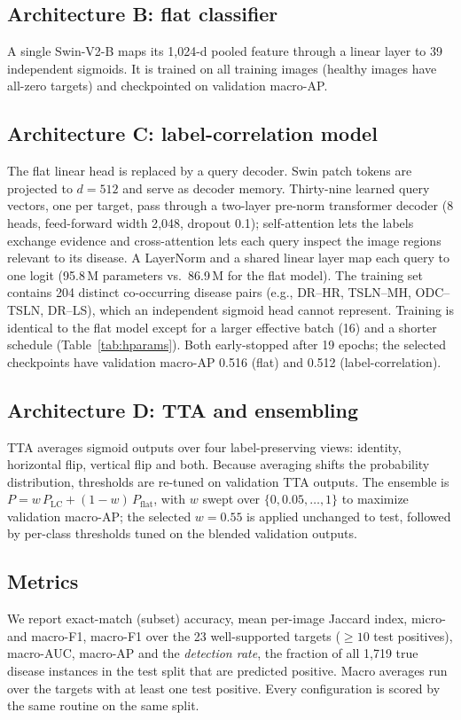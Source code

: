 \documentclass[conference]{IEEEtran}
\begin{document}
\subsection{Architecture B: flat classifier}
A single Swin-V2-B maps its 1{,}024-d pooled feature through a linear layer to 39
independent sigmoids. It is trained on all training images (healthy images have
all-zero targets) and checkpointed on validation macro-AP.

\subsection{Architecture C: label-correlation model}
The flat linear head is replaced by a query decoder. Swin patch tokens are
projected to $d=512$ and serve as decoder memory. Thirty-nine learned query vectors,
one per target, pass through a two-layer pre-norm transformer decoder (8 heads,
feed-forward width 2{,}048, dropout 0.1); self-attention lets the labels exchange
evidence and cross-attention lets each query inspect the image regions relevant to
its disease. A LayerNorm and a shared linear layer map each query to one logit
(95.8\,M parameters vs.\ 86.9\,M for the flat model). The training set contains 204
distinct co-occurring disease pairs (e.g., DR--HR, TSLN--MH, ODC--TSLN, DR--LS),
which an independent sigmoid head cannot represent. Training is identical to the
flat model except for a larger effective batch (16) and a shorter schedule (Table~\ref{tab:hparams}). Both early-stopped after 19 epochs; the selected checkpoints have validation macro-AP 0.516 (flat) and 0.512 (label-correlation).

\subsection{Architecture D: TTA and ensembling}
TTA averages sigmoid outputs over four label-preserving views: identity,
horizontal flip, vertical flip and both. Because averaging shifts the probability
distribution, thresholds are re-tuned on validation TTA outputs. The ensemble is
$P = w\,P_{\mathrm{LC}} + (1-w)\,P_{\mathrm{flat}}$, with $w$ swept over
$\{0,0.05,\dots,1\}$ to maximize validation macro-AP; the selected $w=0.55$ is
applied unchanged to test, followed by per-class thresholds tuned on the blended
validation outputs.

\subsection{Metrics}
We report exact-match (subset) accuracy, mean per-image Jaccard index, micro- and
macro-F1, macro-F1 over the 23 well-supported targets ($\geq10$ test positives),
macro-AUC, macro-AP and the \emph{detection rate}, the fraction of all 1{,}719 true
disease instances in the test split that are predicted positive. Macro averages run
over the targets with at least one test positive. Every configuration is scored by
the same routine on the same split.
\end{document}
